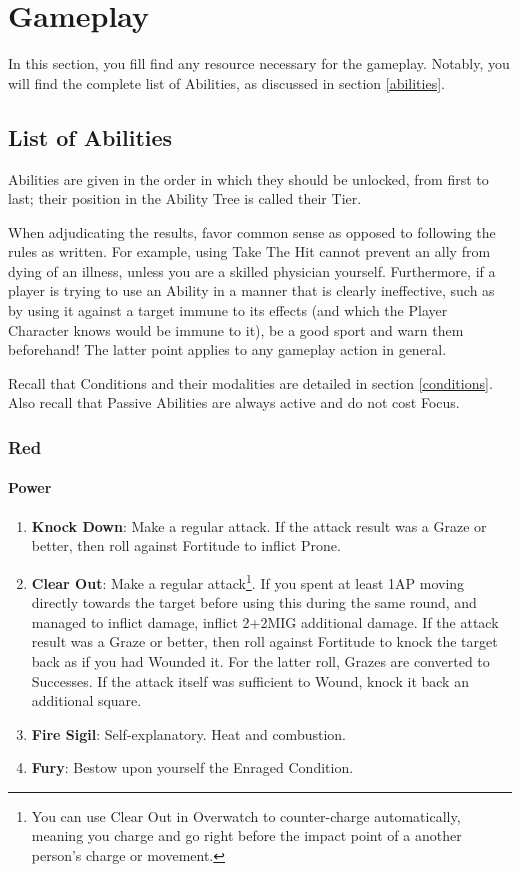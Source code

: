 \chapter{Gameplay}

In this section, you fill find any resource necessary for the gameplay. Notably, you will find the complete list of Abilities, as discussed in section \ref{abilities}.

\section{List of Abilities}
\label{abilities_list}

Abilities are given in the order in which they should be unlocked, from first to last; their position in the Ability Tree is called their Tier. 

When adjudicating the results, favor common sense as opposed to following the rules as written. For example, using Take The Hit cannot prevent an ally from dying of an illness, unless you are a skilled physician yourself. Furthermore, if a player is trying to use an Ability in a manner that is clearly ineffective, such as by using it against a target immune to its effects (and which the Player Character knows would be immune to it), be a good sport and warn them beforehand! The latter point applies to any gameplay action in general.

Recall that Conditions and their modalities are detailed in section \ref{conditions}. Also recall that Passive Abilities are always active and do not cost Focus.

\subsection{Red}

\subsubsection{Power}
\begin{enumerate}
    \item \textbf{Knock Down}: Make a regular attack. If the attack result was a Graze or better, then roll against Fortitude to inflict Prone.
    \item \textbf{Clear Out}: Make a regular attack\footnote{You can use Clear Out in Overwatch to counter-charge automatically, meaning you charge and go right before the impact point of a another person's charge or movement.}. If you spent at least 1AP moving directly towards the target before using this during the same round, and managed to inflict damage, inflict 2+2\texttimes MIG additional damage. If the attack result was a Graze or better, then roll against Fortitude to knock the target back as if you had Wounded it. For the latter roll, Grazes are converted to Successes. If the attack itself was sufficient to Wound, knock it back an additional square.
    \item \textbf{Fire Sigil}: Self-explanatory. Heat and combustion.
    \item \textbf{Fury}: Bestow upon yourself the Enraged Condition.
\end{enumerate}

